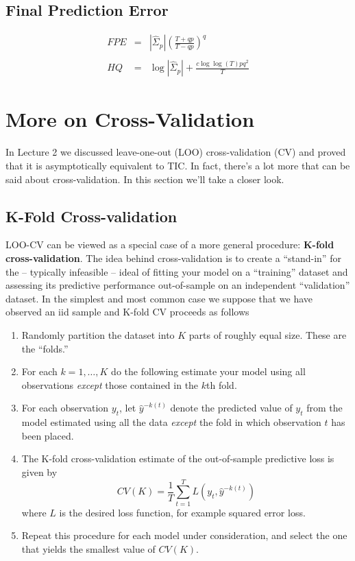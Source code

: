 \documentclass[12pt]{article}
\theoremstyle{definition}
\begin{document}
\subsection{Final Prediction Error}
\begin{eqnarray*}
	FPE &=& \left| \widehat{\Sigma}_p \right| \left( \frac{T + qp}{T - qp}\right)^q\\ \\
	HQ &=& \log \left| \widehat{\Sigma}_p\right| +  \frac{c \log\log(T)pq^2}{T}
\end{eqnarray*}



\section{More on Cross-Validation}
In Lecture 2 we discussed leave-one-out (LOO) cross-validation (CV) and proved that it is asymptotically equivalent to TIC. In fact, there's a lot more that can be said about cross-validation. In this section we'll take a closer look.

\subsection{K-Fold Cross-validation}
LOO-CV can be viewed as a special case of a more general procedure: \textbf{K-fold cross-validation}. The idea behind cross-validation is to create a ``stand-in'' for the -- typically infeasible -- ideal of fitting your model on a ``training'' dataset and assessing its predictive performance out-of-sample on an independent ``validation'' dataset. In the simplest and most common case we suppose that we have observed an iid sample and K-fold CV proceeds as follows
	\begin{enumerate}
		\item Randomly partition the dataset into $K$ parts of roughly equal size. These are the ``folds.''
		\item For each $k = 1, \hdots, K$ do the following estimate your model using all observations \emph{except} those contained in the $k$th fold. 
		\item For each observation $y_t$, let $\widehat{y}^{-k(t)}$ denote the predicted value of $y_t$ from the model estimated using all the data \emph{except} the fold in which observation $t$ has been placed.
		\item The K-fold cross-validation estimate of the out-of-sample predictive loss is given by
			$$CV(K) = \frac{1}{T}\sum_{t=1}^T L\left(y_t, \widehat{y}^{-k(t)}\right)$$
		where $L$ is the desired loss function, for example squared error loss.
		\item Repeat this procedure for each model under consideration, and select the one that yields the smallest value of $CV(K)$.
	\end{enumerate}
\end{document}
